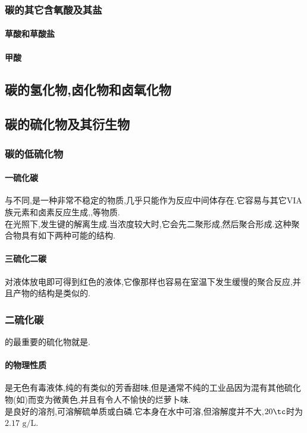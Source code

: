 \documentclass{ctexart}
\begin{document}
\subsubsection{碳的其它含氧酸及其盐}
\paragraph{草酸和草酸盐}
\paragraph{甲酸}
\subsection{碳的氢化物,卤化物和卤氧化物}
\subsection{碳的硫化物及其衍生物}
\subsubsection{碳的低硫化物}
\paragraph{一硫化碳}
与不同,是一种非常不稳定的物质,几乎只能作为反应中间体存在.它容易与其它VIA族元素和卤素反应生成,,等物质.\\
\indent 在光照下,发生键的解离生成.当浓度较大时,它会先二聚形成,然后聚合形成.这种聚合物具有如下两种可能的结构.
\paragraph{三硫化二碳}
对液体放电即可得到红色的液体,它像那样也容易在室温下发生缓慢的聚合反应,并且产物的结构是类似的.
\subsubsection{二硫化碳}
的最重要的硫化物就是.
\paragraph{的物理性质}
是无色有毒液体,纯的有类似的芳香甜味,但是通常不纯的工业品因为混有其他硫化物(如)而变为微黄色,并且有令人不愉快的烂萝卜味.\\
\indent {}是良好的溶剂,可溶解硫单质或白磷.它本身在水中可溶,但溶解度并不大,$20\tc$时为$2.17\text{ g/L}$.
\end{document}
